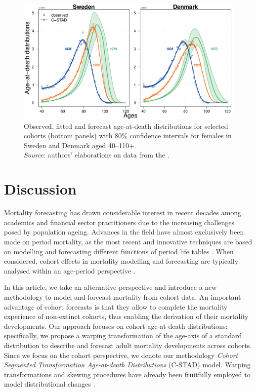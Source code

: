 \documentclass[11pt, a4paper]{article}
\begin{document}
\begin{figure}[h!]
	\begin{center}
		\includegraphics[scale=0.57]{./Figures/F8.pdf}  
		\caption{Observed, fitted and forecast age-at-death distributions for selected cohorts (bottom panels) with 80\% confidence intervals for females in Sweden and Denmark aged 40--110+.\\ \small \textit{Source}: authors' elaborations on data from the \cite{HMD}.\label{Fig:CSTADforeDx}}    
	\end{center}
\end{figure}

\section{Discussion} 
\label{Sec:Discussion}
Mortality forecasting has drawn considerable interest in recent decades among academics and financial sector practitioners due to the increasing challenges posed by population ageing. Advances in the field have almost exclusively been made on period mortality, as the most recent and innovative techniques are based on modelling and forecasting different functions of period life tables \cite[see, for example,][]{lee1992modeling,cairns2006two,raftery2013bayesian}. When considered, cohort effects in mortality modelling and forecasting are typically analysed within an age-period perspective \citep{renshaw2006cohort,cairns2009quantitative,plat2009stochastic,dokumentov2018bivariate}.  
 
In this article, we take an alternative perspective and introduce a new methodology to model and forecast mortality from cohort data. An important advantage of cohort forecasts is that they allow to complete the mortality experience of non-extinct cohorts, thus enabling the derivation of their mortality developments. Our approach focuses on cohort age-at-death distributions: specifically, we propose a warping transformation of the age-axis of a standard distribution to describe and forecast adult mortality developments across cohorts. Since we focus on the cohort perspective, we denote our methodology \emph{Cohort Segmented Transformation Age-at-death Distributions} (C-STAD) model. Warping transformations and skewing procedures have already been fruitfully employed to model distributional changes \cite[see, e.g.,][]{fernandez1998bayesian,camarda2008warped}. 
\end{document}

